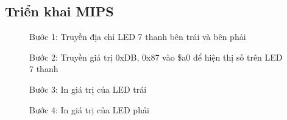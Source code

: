 \documentclass[a4paper,12pt]{article}
\begin{document}
\subsection{Triển khai MIPS}
\FloatBarrier
\begin{figure}[ht!]
	\centerline{}
	\caption*{Bước 1: Truyền địa chỉ LED 7 thanh bên trái và bên phải}
	\label{fig:ass1}
\end{figure}
\FloatBarrier
\begin{figure}[ht!]
	\centerline{}
	\caption*{Bước 2: Truyền giá trị 0xDB, 0x87 vào \$a0 để hiện thị số trên LED 7 thanh}
	\label{fig:ass1}
\end{figure}
\FloatBarrier
\begin{figure}[ht!]
	\centerline{}
	\caption*{Bước 3: In giá trị của LED trái}
	\label{fig:ass1}
\end{figure}
\FloatBarrier
\begin{figure}[ht!]
	\centerline{}
	\caption*{Bước 4: In giá trị của LED phải}
	\label{fig:ass1}
\end{figure}
\FloatBarrier
\end{document}
